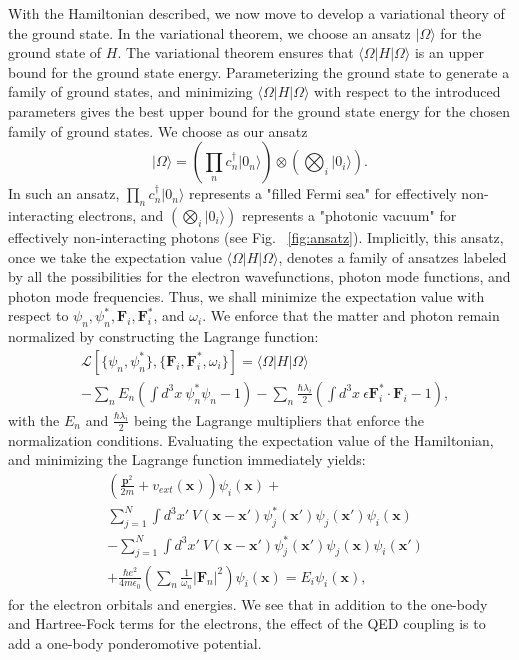\documentclass[aps,prl,twocolumn,
	groupedaddress,superscriptaddress,
	amsfonts,amssymb,amsmath,floatfix,
	citeautoscript]{revtex4-1}
\begin{document}
With the Hamiltonian described, we now move to develop a variational theory of the ground state. In the variational theorem, we choose an ansatz $|\Omega\rangle$ for the ground state of $H$. The variational theorem ensures that $\langle \Omega|H|\Omega\rangle$ is an upper bound for the ground state energy. Parameterizing the ground state to generate a family of ground states, and minimizing $\langle \Omega|H|\Omega\rangle$ with respect to the introduced parameters gives the best upper bound for the ground state energy for the chosen family of ground states.  We choose as our ansatz
\begin{equation}
|\Omega\rangle = \left( \prod\limits_n c_n^{\dagger}|0_n\rangle\right) \otimes \left(\bigotimes_i|0_i\rangle\right).
\label{eq:ansatz}
\end{equation}
In such an ansatz, $\prod\limits_n c_n^{\dagger}|0_n\rangle$ represents a "filled Fermi sea" for effectively non-interacting electrons, and $\left(\bigotimes_i|0_i\rangle\right)$ represents a "photonic vacuum" for effectively non-interacting photons (see Fig. ~\ref{fig:ansatz}). Implicitly, this ansatz, once we take the expectation value $\langle \Omega|H|\Omega\rangle$, denotes a family of ansatzes labeled by all the possibilities for the electron wavefunctions,  photon mode functions, and photon mode frequencies. Thus, we shall minimize the expectation value with respect to $\psi_n, \psi_n^*, \mathbf{F}_i, \mathbf{F}_i^*$, and $\omega_i$.  We enforce that the matter and photon remain normalized by constructing the Lagrange function:
\begin{align}
&\mathcal{L}[\{ \psi_n,\psi_n^* \},\{ \mathbf{F}_i,\mathbf{F}_i^*,\omega_i \}] = \langle \Omega |H|\Omega\rangle \\
&- \sum_n E_n\left(\int d^3x ~\psi_n^*\psi_n - 1 \right) - \sum_n \frac{\hbar\lambda_i}{2}\left(\int d^3x ~\epsilon\mathbf{F}_i^*\cdot\mathbf{F}_i - 1 \right),\nonumber
\end{align}
with the $E_n$ and $\frac{\hbar\lambda_i}{2}$ being the Lagrange multipliers that enforce the normalization conditions. Evaluating the expectation value of the Hamiltonian, and minimizing the Lagrange function  immediately yields:
\begin{align}
&\left(\frac{\mathbf{p}^2}{2m}+v_{ext}(\mathbf{x}) \right)\psi_i(\mathbf{x}) + \nonumber \\ &\sum\limits_{j=1}^N \int d^3x' ~ V(\mathbf{x}-\mathbf{x}')\psi^*_j(\mathbf{x}')\psi_j(\mathbf{x}')\psi_i(\mathbf{x}) \nonumber \\ & - \sum\limits_{j=1}^N \int d^3x' ~ V(\mathbf{x}-\mathbf{x}')\psi^*_j(\mathbf{x}')\psi_j(\mathbf{x})\psi_i(\mathbf{x}')  \nonumber \\ &+ \frac{\hbar e^2}{4m\epsilon_0}\left(\sum_n \frac{1}{\omega_n}|\mathbf{F}_n|^2\right)\psi_i(\mathbf{x})   = E_i\psi_i(\mathbf{x}),
\label{eq:mhf-electron}
\end{align}
for the electron orbitals and energies. We see that in addition to the one-body and Hartree-Fock terms for the electrons, the effect of the QED coupling is to add a one-body ponderomotive potential. %
\end{document}
